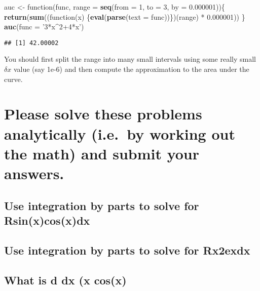 \documentclass[]{article}
\newenvironment{Shaded}{\begin{snugshade}}{\end{snugshade}}
\newcommand{\KeywordTok}[1]{\textcolor[rgb]{0.13,0.29,0.53}{\textbf{{#1}}}}
\newcommand{\DataTypeTok}[1]{\textcolor[rgb]{0.13,0.29,0.53}{{#1}}}
\newcommand{\DecValTok}[1]{\textcolor[rgb]{0.00,0.00,0.81}{{#1}}}
\newcommand{\FloatTok}[1]{\textcolor[rgb]{0.00,0.00,0.81}{{#1}}}
\newcommand{\StringTok}[1]{\textcolor[rgb]{0.31,0.60,0.02}{{#1}}}
\newcommand{\NormalTok}[1]{{#1}}
\begin{document}
\begin{Shaded}
\begin{Highlighting}[]
\NormalTok{auc <-}\StringTok{ }\NormalTok{function(func, }\DataTypeTok{range =} \KeywordTok{seq}\NormalTok{(}\DataTypeTok{from =} \DecValTok{1}\NormalTok{, }\DataTypeTok{to =} \DecValTok{3}\NormalTok{, }\DataTypeTok{by =} \FloatTok{0.000001}\NormalTok{))\{}
        \KeywordTok{return}\NormalTok{(}\KeywordTok{sum}\NormalTok{((function(x) \{}\KeywordTok{eval}\NormalTok{(}\KeywordTok{parse}\NormalTok{(}\DataTypeTok{text =} \NormalTok{func))\})(range) *}\StringTok{ }\FloatTok{0.000001}\NormalTok{))}
       \NormalTok{\}}
\KeywordTok{auc}\NormalTok{(}\DataTypeTok{func =} \StringTok{'3*x^2+4*x'}\NormalTok{)}
\end{Highlighting}
\end{Shaded}

\begin{verbatim}
## [1] 42.00002
\end{verbatim}

You should first split the range into many small intervals using some
really small \(\delta x\) value (say 1e-6) and then compute the
approximation to the area under the curve.

\section{Please solve these problems analytically (i.e.~by working out
the math) and submit your
answers.}\label{please-solve-these-problems-analytically-i.e.by-working-out-the-math-and-submit-your-answers.}

\subsection{Use integration by parts to solve for
Rsin(x)cos(x)dx}\label{use-integration-by-parts-to-solve-for-rsinxcosxdx}

\subsection{Use integration by parts to solve for
Rx2exdx}\label{use-integration-by-parts-to-solve-for-rx2exdx}

\subsection{What is d dx (x cos(x)}\label{what-is-d-dx-x-cosx}
\end{document}
